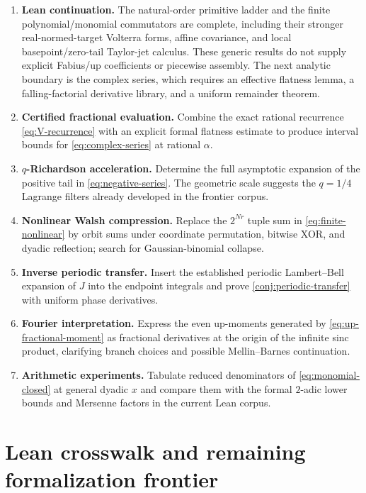 \documentclass[11pt,oneside]{article}
\numberwithin{equation}{section}
\theoremstyle{definition}
\theoremstyle{remark}
\newcommand{\InvF}{J}
\begin{document}
\begin{enumerate}
\item \textbf{Lean continuation.}  The natural-order primitive ladder and the
finite polynomial/monomial commutators are complete, including their stronger
real-normed-target Volterra forms, affine covariance, and local
basepoint/zero-tail Taylor-jet calculus.  These generic results do not supply
explicit Fabius/up coefficients or piecewise assembly.  The next analytic
boundary is the complex series, which
requires an effective flatness lemma, a falling-factorial derivative library,
and a uniform remainder theorem.
\item \textbf{Certified fractional evaluation.}  Combine the exact rational recurrence \eqref{eq:V-recurrence} with an
explicit formal flatness estimate to produce interval bounds for
\eqref{eq:complex-series} at rational $\alpha$.
\item \textbf{$q$-Richardson acceleration.}  Determine the full asymptotic
expansion of the positive tail in \eqref{eq:negative-series}.  The geometric
scale suggests the $q=1/4$ Lagrange filters already developed in the frontier
corpus.
\item \textbf{Nonlinear Walsh compression.}  Replace the $2^{Nr}$ tuple sum in
\eqref{eq:finite-nonlinear} by orbit sums under coordinate permutation,
bitwise XOR, and dyadic reflection; search for Gaussian-binomial collapse.
\item \textbf{Inverse periodic transfer.}  Insert the established periodic
Lambert--Bell expansion of $\InvF$ into the endpoint integrals and prove
\cref{conj:periodic-transfer} with uniform phase derivatives.
\item \textbf{Fourier interpretation.}  Express the even up-moments generated
by \eqref{eq:up-fractional-moment} as fractional derivatives at the origin of
the infinite sinc product, clarifying branch choices and possible Mellin--Barnes
continuation.
\item \textbf{Arithmetic experiments.}  Tabulate reduced denominators of
\eqref{eq:monomial-closed} at general dyadic $x$ and compare them with the
formal $2$-adic lower bounds and Mersenne factors in the current Lean corpus.
\end{enumerate}

\section{Lean crosswalk and remaining formalization frontier}
\label{sec:lean-roadmap}
\end{document}

